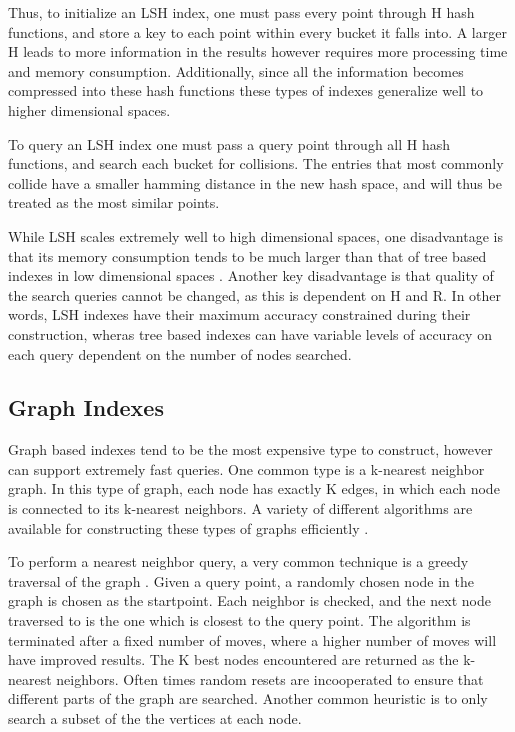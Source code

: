 Thus, to initialize an LSH index, one must pass every point through H hash functions, and store a key to each point within every bucket it falls into.  A larger H leads to more information in the results however requires more processing time and memory consumption.  Additionally, since all the information becomes compressed into these hash functions these types of indexes generalize well to higher dimensional spaces.

To query an LSH index one must pass a query point through all H hash functions, and search each bucket for collisions.  The entries that most commonly collide have a smaller hamming distance in the new hash space, and will thus be treated as the most similar points.

While LSH scales extremely well to high dimensional spaces, one disadvantage is that its memory consumption tends to be much larger than that of tree based indexes in low dimensional spaces \citep{datar2004locality}.  Another key disadvantage is that quality of the search queries cannot be changed, as this is dependent on H and R.  In other words, LSH indexes have their maximum accuracy constrained during their construction, wheras tree based indexes can have variable levels of accuracy on each query dependent on the number of nodes searched.

\subsection{Graph Indexes}

Graph based indexes tend to be the most expensive type to construct, however can support extremely fast queries.  One common type is a k-nearest neighbor graph.  In this type of graph, each node has exactly K edges, in which each node is connected to its k-nearest neighbors.  A variety of different algorithms are available for constructing these types of graphs efficiently \citep{connor2010fast}.

To perform a nearest neighbor query, a very common technique is a greedy traversal of the graph \citep{hajebi2011fast}.  Given a query point, a randomly chosen node in the graph is chosen as the startpoint.  Each neighbor is checked, and the next node traversed to is the one which is closest to the query point.  The algorithm is terminated after a fixed number of moves, where a higher number of moves will have improved results.  The K best nodes encountered are returned as the k-nearest neighbors.  Often times random resets are incooperated to ensure that different parts of the graph are searched.  Another common heuristic is to only search a subset of the the vertices at each node.

